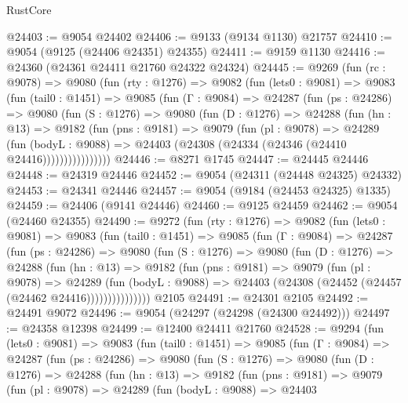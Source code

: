 \begin{lexlean}{RustCore}
\begin{coremodule}
@24403 := @9054 @24402
@24406 := @9133 (@9134 @1130) @21757
@24410 := @9054 (@9125 (@24406 @24351) @24355)
@24411 := @9159 @1130
@24416 := @24360 (@24361 @24411 @21760 @24322 @24324)
@24445 := @9269
    (fun (rc : @9078) =>
    @9080
      (fun (rty : @1276) =>
      @9082
        (fun (lets0 : @9081) =>
        @9083
          (fun (tail0 : @1451) =>
          @9085
            (fun (Γ : @9084) =>
            @24287
              (fun (ps : @24286) =>
              @9080
                (fun (S : @1276) =>
                @9080
                  (fun (D : @1276) =>
                  @24288
                    (fun (hn : @13) =>
                    @9182
                      (fun (pns : @9181) =>
                      @9079
                        (fun (pl : @9078) =>
                        @24289
                          (fun (bodyL : @9088) =>
                          @24403 (@24308 (@24334 (@24346 (@24410 @24416))))))))))))))))
@24446 := @8271 @1745
@24447 := @24445 @24446
@24448 := @24319 @24446
@24452 := @9054 (@24311 (@24448 @24325) @24332)
@24453 := @24341 @24446
@24457 := @9054 (@9184 (@24453 @24325) @1335)
@24459 := @24406 (@9141 @24446)
@24460 := @9125 @24459
@24462 := @9054 (@24460 @24355)
@24490 := @9272
    (fun (rty : @1276) =>
    @9082
      (fun (lets0 : @9081) =>
      @9083
        (fun (tail0 : @1451) =>
        @9085
          (fun (Γ : @9084) =>
          @24287
            (fun (ps : @24286) =>
            @9080
              (fun (S : @1276) =>
              @9080
                (fun (D : @1276) =>
                @24288
                  (fun (hn : @13) =>
                  @9182
                    (fun (pns : @9181) =>
                    @9079
                      (fun (pl : @9078) =>
                      @24289
                        (fun (bodyL : @9088) =>
                        @24403 (@24308 (@24452 (@24457 (@24462 @24416)))))))))))))))
    @2105
@24491 := @24301 @2105
@24492 := @24491 @9072
@24496 := @9054 (@24297 (@24298 (@24300 @24492)))
@24497 := @24358 @12398
@24499 := @12400 @24411 @21760
@24528 := @9294
    (fun (lets0 : @9081) =>
    @9083
      (fun (tail0 : @1451) =>
      @9085
        (fun (Γ : @9084) =>
        @24287
          (fun (ps : @24286) =>
          @9080
            (fun (S : @1276) =>
            @9080
              (fun (D : @1276) =>
              @24288
                (fun (hn : @13) =>
                @9182
                  (fun (pns : @9181) =>
                  @9079
                    (fun (pl : @9078) =>
                    @24289
                      (fun (bodyL : @9088) =>
                      @24403

\end{coremodule}
\end{lexlean}
